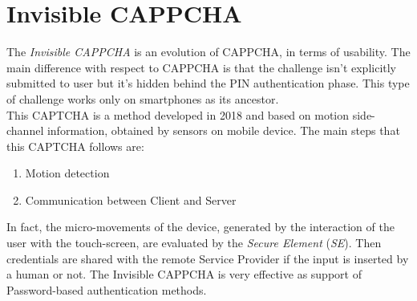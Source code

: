 \chapter{Invisible CAPPCHA}\label{chapter:InvisibleCAPPCHA}
The \textit{Invisible CAPPCHA} is an evolution of CAPPCHA, in terms of usability\cite{Invisible_CAPPCHA}. The main difference with respect to CAPPCHA is that the challenge isn't explicitly submitted to user but it's hidden behind the PIN authentication phase. This type of challenge works only on smartphones as its ancestor.\\
This CAPTCHA is a method developed in 2018 and based on motion side-channel information, obtained by sensors on mobile device. The main steps that this CAPTCHA follows are:
\begin{enumerate}
\item{Motion detection}
\item{Communication between Client and Server}
\end{enumerate}
In fact, the micro-movements of the device, generated by the interaction of the user with the touch-screen, are evaluated by the \textit{Secure Element} (\textit{SE}). Then credentials are shared with the remote Service Provider if the input is inserted by a human or not. The Invisible CAPPCHA is very effective as support of Password-based authentication methods.

